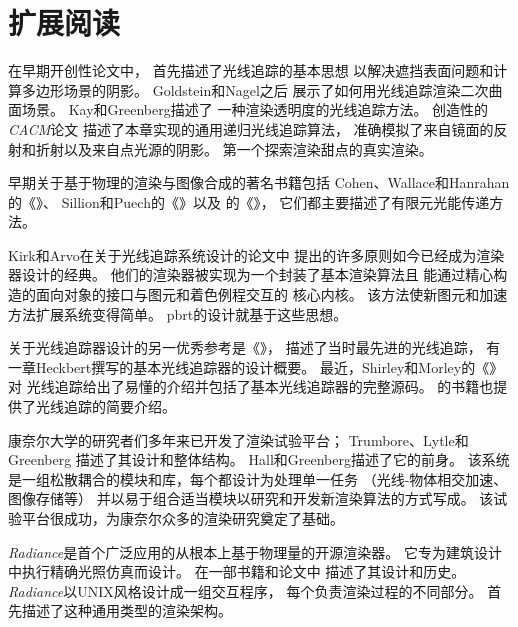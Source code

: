 \section{扩展阅读}\label{sec:扩展阅读1}

在早期开创性论文中，
\citet{10.1145/1468075.1468082}首先描述了光线追踪的基本思想
以解决遮挡表面问题和计算多边形场景的阴影。
Goldstein和Nagel\parencite*{doi:10.1177/003754977101600104}之后
展示了如何用光线追踪渲染二次曲面场景。
Kay和Greenberg\parencite*{10.1145/800249.807438}描述了
一种渲染透明度的光线追踪方法。
\citet{10.1145/358876.358882}创造性的\emph{CACM}论文
描述了本章实现的通用递归光线追踪算法，
准确模拟了来自镜面的反射和折射以及来自点光源的阴影。
\citet{10.1145/37402.37411}第一个探索渲染甜点的真实渲染。

早期关于基于物理的渲染与图像合成的著名书籍包括
Cohen、Wallace和Hanrahan的《》\parencite*{10.5555/154731}、
Sillion和Puech的《》\parencite*{10.5555/561383}以及
\citeauthor{10.5555/200607}的《》\parencite*{10.5555/200607}，
它们都主要描述了有限元光能传递方法。

Kirk和Arvo\parencite*{Kirk88theray}在关于光线追踪系统设计的论文中
提出的许多原则如今已经成为渲染器设计的经典。
他们的渲染器被实现为一个封装了基本渲染算法且
能通过精心构造的面向对象的接口与图元和着色例程交互的
核心内核。
该方法使新图元和加速方法扩展系统变得简单。
pbrt的设计就基于这些思想。

关于光线追踪器设计的另一优秀参考是《》\citep{10.5555/94788}，
描述了当时最先进的光线追踪，
有一章Heckbert撰写的基本光线追踪器的设计概要。
最近，Shirley和Morley的《》\parencite*{10.5555/940410}对
光线追踪给出了易懂的介绍并包括了基本光线追踪器的完整源码。
\citet{10.5555/1324795}的书籍也提供了光线追踪的简要介绍。

康奈尔大学的研究者们多年来已开发了渲染试验平台；
Trumbore、Lytle和Greenberg\parencite*{egtp.19911035}
描述了其设计和整体结构。
Hall和Greenberg\parencite*{4037684}描述了它的前身。
该系统是一组松散耦合的模块和库，每个都设计为处理单一任务
（光线-物体相交加速、图像存储等）
并以易于组合适当模块以研究和开发新渲染算法的方式写成。
该试验平台很成功，为康奈尔众多的渲染研究奠定了基础。

\emph{Radiance}是首个广泛应用的从根本上基于物理量的开源渲染器。
它专为建筑设计中执行精确光照仿真而设计。
\citeauthor{10.1145/192161.192286}在一部书籍和论文中
\citep{10.1145/192161.192286,10.5555/286090}描述了其设计和历史。
\emph{Radiance}以UNIX风格设计成一组交互程序，
每个负责渲染过程的不同部分。
\citet{10.1145/325334.325174}首先描述了这种通用类型的渲染架构。

